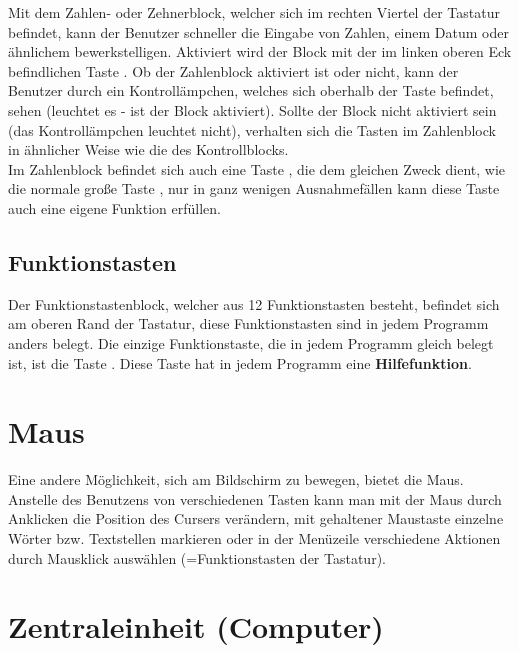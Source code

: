 Mit dem Zahlen- oder Zehnerblock, welcher sich im rechten Viertel der
Tastatur befindet, kann der Benutzer schneller die Eingabe von
Zahlen, einem Datum oder \"{a}hnlichem bewerkstelligen. Aktiviert
wird der Block mit der im linken oberen Eck befindlichen Taste
. Ob der Zahlenblock aktiviert ist oder nicht, kann
der Benutzer durch ein Kontroll\"{a}mpchen, welches sich oberhalb der
Taste befindet, sehen (leuchtet es - ist der Block aktiviert). Sollte
der Block nicht aktiviert sein (das Kontroll\"{a}mpchen leuchtet nicht), verhalten sich die Tasten im Zahlenblock in \"{a}hnlicher Weise
wie die des Kontrollblocks.\\
Im Zahlenblock befindet sich auch eine Taste , die
dem gleichen Zweck dient, wie die normale gro{\ss}e Taste ,
nur in ganz wenigen Ausnahmef\"{a}llen kann diese Taste auch eine
eigene Funktion erf\"{u}llen.

\subsection{Funktionstasten} 

Der Funktionstastenblock, welcher aus 12 Funktionstasten besteht,
befindet sich am oberen Rand der Tastatur, diese Funktionstasten
sind in jedem Programm anders belegt. Die einzige Funktionstaste,
die in jedem Programm gleich belegt ist, ist die Taste .
Diese Taste hat in jedem Programm eine {\bf Hilfefunktion}.

\section{Maus}

Eine andere M\"{o}glichkeit, sich am Bildschirm zu bewegen, bietet die
Maus. Anstelle des Benutzens von verschiedenen Tasten kann man mit der Maus
durch Anklicken die Position des Cursers ver\"{a}ndern, mit gehaltener
Maustaste einzelne W\"{o}rter bzw. Textstellen markieren oder in der
Men\"{u}zeile verschiedene Aktionen durch Mausklick ausw\"{a}hlen (=Funktionstasten der Tastatur).

\section{Zentraleinheit (Computer)}

